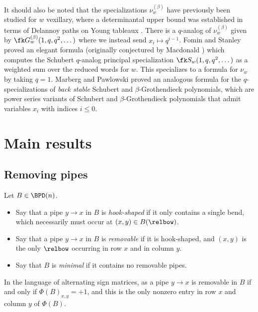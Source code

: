 It should also be noted that the specializations $\nu^{(\beta)}_w$ have previously been studied for $w$ vexillary, where a determinantal upper bound was established in terms of Delannoy paths on Young tableaux \cite{MPP22}.
There is a $q$-analog of $\nu^{(\beta)}_w$ given by $\fk G^{(\beta)}_w(1,q,q^2,\dots)$ where we instead send $x_i\mapsto q^{i-1}$.
Fomin and Stanley \cite{FS94} proved an elegant formula (originally conjectured by Macdonald \cite{Mac91}) which computes the Schubert $q$-analog principal specialization $\fk S_w(1,q,q^2,\dots)$ as a weighted sum over the reduced words for $w$.
This specializes to a formula for $\nu_w$ by taking $q=1$.
Marberg and Pawlowski \cite{MP21} proved an analogous formula for the $q$-specializations of \textit{back stable} Schubert and $\beta$-Grothendieck polynomials, which are power series variants of Schubert and $\beta$-Grothendieck polynomials that admit variables $x_i$ with indices $i\leq 0$.





\section{Main results}

\subsection{Removing pipes}
\label{sect:rem_pipes}

\begin{definition}
    Let $B\in \BPD(n)$.
    \begin{itemize}
        \item Say that a pipe $y\to x$ in $B$ is \textit{hook-shaped} if it only contains a single bend, which necessarily must occur at $(x,y)\in B(\relbow)$.
        \item Say that a pipe $y\to x$ in $B$ is \textit{removable} if it is hook-shaped, and $(x,y)$ is the only $\relbow$ occurring in row $x$ and in column $y$.
        \item Say that $B$ is \textit{minimal} if it contains no removable pipes.
    \end{itemize}
\end{definition}

In the language of alternating sign matrices, as a pipe $y\to x$ is removable in $B$ if and only if $\Phi(B)_{x,y} = +1$, and this is the only nonzero entry in row $x$ and column $y$ of $\Phi(B)$.

